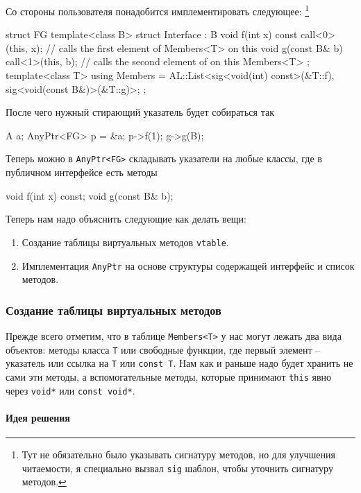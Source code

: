 Со стороны пользователя понадобится имплементировать следующее:%
\footnote{Тут не обязательно было указывать сигнатуру методов, но для улучшения читаемости, я специально вызвал \verb"sig" шаблон, чтобы уточнить сигнатуру методов.}
\begin{cppcode}
struct FG {
  template<class B>
  struct Interface : B {
    void f(int x) const {
      call<0>(this, x); // calls the first element of Members<T> on this
    }
    void g(const B& b) {
      call<1>(this, b); // calls the second element of on this Members<T>
    }
  };
  template<class T>
  using Members = AL::List<sig<void(int) const>(&T::f), sig<void(const B&)>(&T::g)>;
};
\end{cppcode}
После чего нужный стирающий указатель будет собираться так
\begin{cppcode}
A a;
AnyPtr<FG> p = &a;
p->f(1);
g->g(B{});
\end{cppcode}
Теперь можно в \verb"AnyPtr<FG>" складывать указатели на любые классы, где в публичном интерфейсе есть методы
\begin{cppcode}
void f(int x) const;
void g(const B& b);
\end{cppcode}
Теперь нам надо объяснить следующие как делать вещи:
\begin{enumerate}
\item Создание таблицы виртуальных методов \verb"vtable".

\item Имплементация \verb"AnyPtr" на основе структуры содержащей интерфейс и список методов.
\end{enumerate}

\subsubsection{Создание таблицы виртуальных методов}
\label{section::VTableGeneral}

Прежде всего отметим, что в таблице \verb"Members<T>" у нас могут лежать два вида объектов: методы класса \verb"T" или свободные функции, где первый элемент -- указатель или ссылка на \verb"T" или \verb"const T".
Нам как и раньше надо будет хранить не сами эти методы, а вспомогательные методы, которые принимают \verb"this" явно через \verb"void*" или \verb"const void*".

\paragraph{Идея решения}


